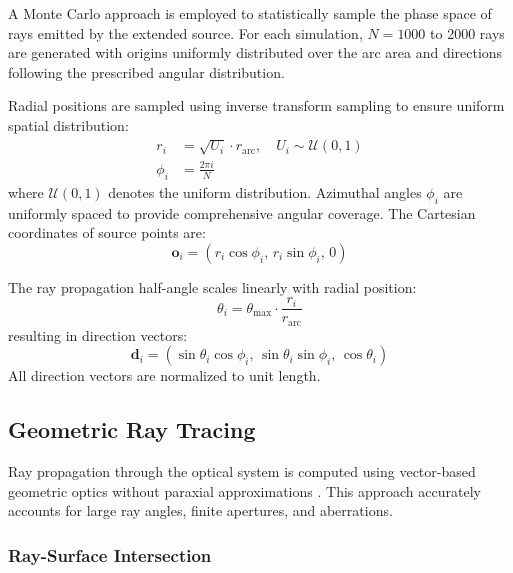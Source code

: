 A Monte Carlo approach is employed to statistically sample the phase space of rays emitted by the extended source. For each simulation, $N = 1000$ to 2000 rays are generated with origins uniformly distributed over the arc area and directions following the prescribed angular distribution.

Radial positions are sampled using inverse transform sampling to ensure uniform spatial distribution:
\begin{align}
r_i &= \sqrt{U_i} \cdot r_{\text{arc}}, \quad U_i \sim \mathcal{U}(0,1) \\
\phi_i &= \frac{2\pi i}{N}
\end{align}
where $\mathcal{U}(0,1)$ denotes the uniform distribution. Azimuthal angles $\phi_i$ are uniformly spaced to provide comprehensive angular coverage. The Cartesian coordinates of source points are:
\begin{equation}
\mathbf{o}_i = (r_i \cos\phi_i, \, r_i \sin\phi_i, \, 0)
\end{equation}

The ray propagation half-angle scales linearly with radial position:
\begin{equation}
\theta_i = \theta_{\max} \cdot \frac{r_i}{r_{\text{arc}}}
\end{equation}
resulting in direction vectors:
\begin{equation}
\mathbf{d}_i = (\sin\theta_i \cos\phi_i, \, \sin\theta_i \sin\phi_i, \, \cos\theta_i)
\end{equation}
All direction vectors are normalized to unit length.

\subsection{Geometric Ray Tracing}

Ray propagation through the optical system is computed using vector-based geometric optics without paraxial approximations \cite{glassner1989}. This approach accurately accounts for large ray angles, finite apertures, and aberrations.

\subsubsection{Ray-Surface Intersection}

